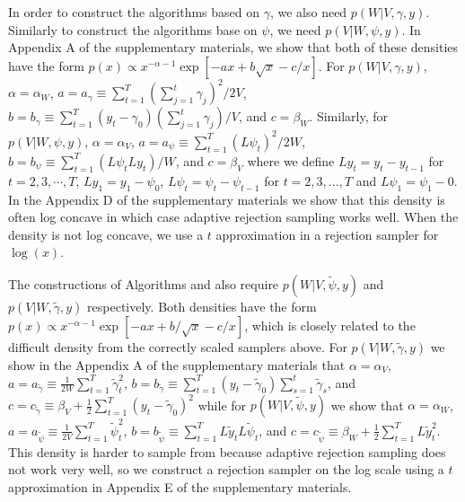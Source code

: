 \documentclass[12pt]{article}
\begin{document}
In order to construct the algorithms based on $\gamma$, we also need $p(W|V,\gamma,y)$. Similarly to construct the algorithms base on $\psi$, we need $p(V|W,\psi,y)$. In Appendix A of the supplementary materials, we show that both of these densities have the form $p(x)\propto x^{-\alpha-1}\exp\left[ -ax + b\sqrt{x} -c/x\right]$. For $p(W|V,\gamma,y)$, $\alpha=\alpha_W$, $a=a_\gamma \equiv \sum_{t=1}^T(\sum_{j=1}^t\gamma_j)^2/2V$, $b=b_\gamma \equiv\sum_{t=1}^T(y_t-\gamma_0)(\sum_{j=1}^t\gamma_j)/V$, and $c=\beta_W$. Similarly, for $p(V|W,\psi,y)$, $\alpha=\alpha_V$, $a=a_{\psi}\equiv\sum_{t=1}^T(L\psi_t)^2/2W$, $b=b_{\psi}\equiv\sum_{t=1}^T(L\psi_tLy_t)/W$, and $c=\beta_V$ where we define $Ly_t=y_t-y_{t-1}$ for $t=2,3,\cdots,T$, $Ly_1=y_1 - \psi_0$, $L\psi_t = \psi_t - \psi_{t-1}$ for $t=2,3,...,T$ and $L\psi_1=\psi_1-0$. In the Appendix D of the supplementary materials we show that this density is often log concave in which case adaptive rejection sampling \citep{gilks1992adaptive} works well. When the density is not log concave, we use a $t$ approximation in a rejection sampler for $\log(x)$.

The constructions of Algorithms  and  also require $p(W|V,\tilde{\psi},y)$ and $p(V|W,\tilde{\gamma},y)$ respectively. Both densities have the form $p(x)\propto x^{-\alpha-1}\exp\left[ -ax + b/\sqrt{x} -c/x\right]$, which is closely related to the difficult density from the correctly scaled samplers above.  For $p(V|W,\tilde{\gamma},y)$ we show in the Appendix A of the supplementary materials that $\alpha=\alpha_V$, $a = a_{\tilde{\gamma}}\equiv\frac{1}{2W}\sum_{t=1}^T\tilde{\gamma}_t^2$, $b =b_{\tilde{\gamma}}\equiv \sum_{t=1}^T(y_t - \tilde{\gamma}_0)\sum_{s=1}^t\tilde{\gamma}_s$, and $c =c_{\tilde{\gamma}}\equiv \beta_V + \frac{1}{2}\sum_{t=1}^T(y_t - \tilde{\gamma}_0)^2$ while for $p(W|V,\tilde{\psi},y)$ we show that $\alpha=\alpha_W$,   $a =a_{\tilde{\psi}}\equiv \frac{1}{2V}\sum_{t=1}^T\tilde{\psi}_t^2$,  $b =b_{\tilde{\psi}}\equiv \sum_{t=1}^TL\tilde{y}_tL\tilde{\psi}_t$, and $c =c_{\tilde{\psi}}\equiv \beta_W + \frac{1}{2}\sum_{t=1}^TL\tilde{y}_t^2$. This density is harder to sample from because adaptive rejection sampling does not work very well, so we construct a rejection sampler on the log scale using a $t$ approximation in Appendix E of the supplementary materials.

\end{document}

